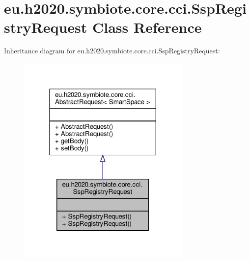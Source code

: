 \hypertarget{classeu_1_1h2020_1_1symbiote_1_1core_1_1cci_1_1SspRegistryRequest}{}\section{eu.\+h2020.\+symbiote.\+core.\+cci.\+Ssp\+Registry\+Request Class Reference}
\label{classeu_1_1h2020_1_1symbiote_1_1core_1_1cci_1_1SspRegistryRequest}


Inheritance diagram for eu.\+h2020.\+symbiote.\+core.\+cci.\+Ssp\+Registry\+Request\+:
\nopagebreak
\begin{figure}[H]
\begin{center}
\leavevmode
\includegraphics[width=242pt]{classeu_1_1h2020_1_1symbiote_1_1core_1_1cci_1_1SspRegistryRequest__inherit__graph}
\end{center}
\end{figure}


